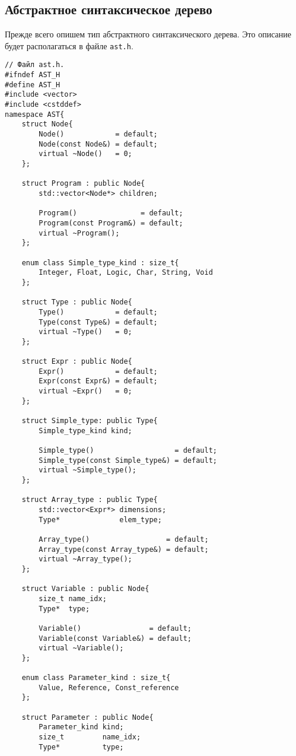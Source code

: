 \documentclass[10pt]{article}
\newcounter{lem}[section]
\newcounter{defin}[section]
\begin{document}
    \subsection{Абстрактное синтаксическое дерево}
Прежде всего опишем тип абстрактного синтаксического дерева. Это описание будет располагаться в файле \texttt{ast.h}.
\begin{verbatim}
// Файл ast.h.
#ifndef AST_H
#define AST_H
#include <vector>
#include <cstddef>
namespace AST{
    struct Node{
        Node()            = default;
        Node(const Node&) = default;
        virtual ~Node()   = 0;
    };

    struct Program : public Node{
        std::vector<Node*> children;
        
        Program()               = default;
        Program(const Program&) = default;
        virtual ~Program();
    };
    
    enum class Simple_type_kind : size_t{
        Integer, Float, Logic, Char, String, Void
    };
    
    struct Type : public Node{
        Type()            = default;
        Type(const Type&) = default;
        virtual ~Type()   = 0;
    };
    
    struct Expr : public Node{
        Expr()            = default;
        Expr(const Expr&) = default;
        virtual ~Expr()   = 0;
    };
    
    struct Simple_type: public Type{
        Simple_type_kind kind;
        
        Simple_type()                   = default;
        Simple_type(const Simple_type&) = default;
        virtual ~Simple_type();
    };
    
    struct Array_type : public Type{
        std::vector<Expr*> dimensions;
        Type*              elem_type;
        
        Array_type()                  = default;
        Array_type(const Array_type&) = default;
        virtual ~Array_type();
    };
    
    struct Variable : public Node{
        size_t name_idx;
        Type*  type;
        
        Variable()                = default;
        Variable(const Variable&) = default;
        virtual ~Variable();
    };
    
    enum class Parameter_kind : size_t{
        Value, Reference, Const_reference
    };
    
    struct Parameter : public Node{
        Parameter_kind kind;
        size_t         name_idx;
        Type*          type;
        

\end{verbatim}
\end{document}
